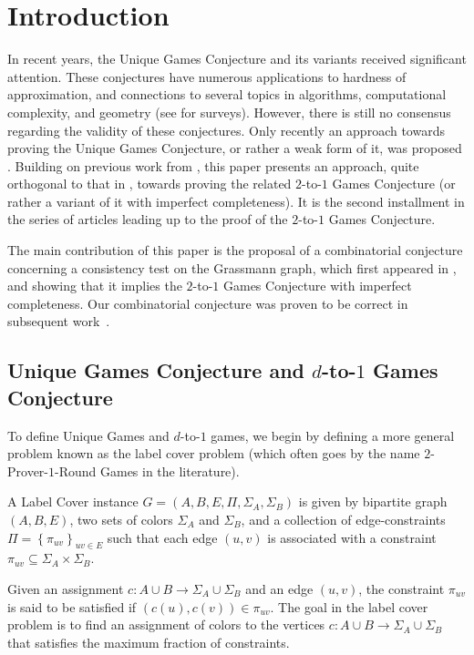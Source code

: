 \documentclass{toc}
\newcommand\set[1]{{\left\{ #1 \right\}}}
\renewcommand\subset{\subseteq}
\begin{document}
\section{Introduction}
In recent years, the Unique Games Conjecture \cite{Khot02} and its variants received
significant attention. These conjectures have numerous applications to hardness
of approximation, and connections to several topics in algorithms, computational
complexity, and geometry (see \cite{Trevisan-survey,KhotUGC-survey,
  KhotICM-survey} for surveys).  However, there is still no consensus regarding
the validity of these conjectures. Only recently an approach towards
proving the Unique Games Conjecture, or rather a weak form of it, was
proposed \cite{KhotMoshkovitz}. Building on previous work from \cite{KMS}, this
paper presents an
approach, quite orthogonal to that in \cite{KhotMoshkovitz}, towards proving the
related $2$-to-$1$ Games Conjecture (or rather a variant of it with imperfect
completeness).
%
It is the second installment in the series of %
articles   %
\cite{KMS,DKKMS1,DKKMSgras,KMS2}
leading up to the proof of the $2$-to-$1$ Games Conjecture.

The main contribution of this paper is the proposal of a combinatorial conjecture
concerning a consistency test on the Grassmann graph, which first appeared in \cite{KMS}, and showing
that it implies the $2$-to-$1$ Games Conjecture with imperfect completeness. Our combinatorial
conjecture was proven to be correct in subsequent %
work~\cite{KMS2}.  %
%
%


\subsection{Unique Games Conjecture and \texorpdfstring{$d$-to-$1$}{2-to1} Games Conjecture}
To define Unique Games and $d$-to-$1$ games, we begin by defining a more
general problem known as the label cover problem (which often goes by
the name $2$-Prover-$1$-Round Games in the literature).

\begin{definition}%
  A Label Cover instance $G=(A,B,E,\Pi,\Sigma_A,\Sigma_B)$
  is given by bipartite graph $(A,B,E)$, two sets of colors $\Sigma_A$
  and $\Sigma_B$, and a collection of edge-constraints
  $\Pi = \set{\pi_{uv}}_{uv\in E}$ such that each edge $(u,v)$ is
  associated with a constraint
  $\pi_{uv} \subset \Sigma_A\times \Sigma_B$.

  Given an assignment $c: A \cup B \to \Sigma_A\cup \Sigma_B $ and an
  edge $(u,v)$, the constraint $\pi_{uv}$ is said to be satisfied if
  $(c(u), c(v))\in \pi_{uv}$. The goal in the label cover problem
  is to find an assignment of colors to the vertices
  $c: A \cup B \to \Sigma_A\cup \Sigma_B $ that  satisfies the
  maximum fraction of  constraints.
\end{definition}
\end{document}
